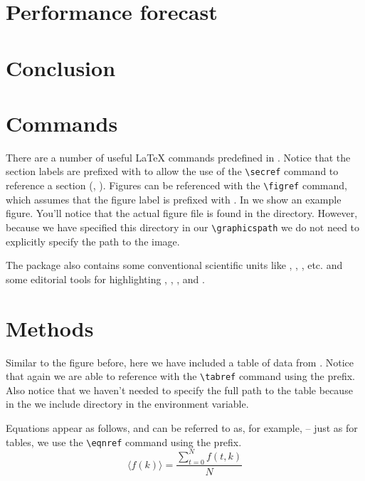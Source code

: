 \documentclass[\docopts]{\docclass}
\begin{document}
\section{Performance forecast}
\label{sec:forecast}


\section{Conclusion}
\label{sec:conclusion}


\section{Commands}
\label{sec:commands}

There are a number of useful \LaTeX\xspace commands predefined in .
Notice that the section labels are prefixed with  to allow the use of the \verb=\secref= command to reference a section (\ie, ).
Figures can be referenced with the \verb=\figref= command, which assumes that the figure label is prefixed with .
In  we show an example figure.
You'll notice that the actual figure file is found in the  directory.
However, because we have specified this directory in our \verb=\graphicspath= we do not need to explicitly specify the path to the image.

The  package also contains some conventional scientific units like \angstrom, \GeV, \Msun, etc. and some editorial tools for highlighting , , , and .



\section{Methods}
\label{sec:methods}

Similar to the figure before, here we have included a table of data from .
Notice that again we are able to reference  with the \verb=\tabref= command using the  prefix.
Also notice that we haven't needed to specify the full path to the table because in the  we include  directory in the  environment variable.



Equations appear as follows, and can be referred to as, for example,  -- just as for tables, we use the \verb=\eqnref= command using the  prefix.
\begin{equation}
  \label{eqn:example}
  \langle f(k) \rangle = \frac{ \sum_{t=0}^{N}f(t,k) }{N}
\end{equation}
\end{document}
